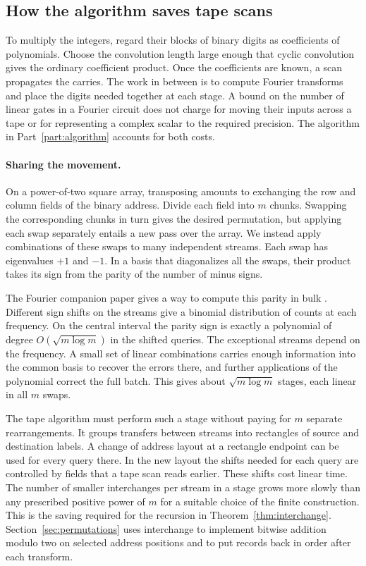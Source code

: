 \subsection{How the algorithm saves tape scans}

To multiply the integers, regard their blocks of binary digits as
coefficients of polynomials. Choose the convolution length large
enough that cyclic convolution gives the ordinary coefficient
product. Once the coefficients are known, a scan propagates the
carries. The work in between is to compute Fourier transforms and
place the digits needed together at each stage. A bound on the number
of linear gates in a Fourier circuit does not charge for moving
their inputs across a tape or for representing a complex scalar to
the required precision. The algorithm in Part~\ref{part:algorithm}
accounts for both costs.

\paragraph{Sharing the movement.}
On a power-of-two square array, transposing amounts to exchanging the
row and column fields of the binary address. Divide each field into
$m$ chunks. Swapping the corresponding chunks in turn gives the
desired permutation, but applying each swap separately entails a new
pass over the array. We instead apply combinations of these swaps to
many independent streams. Each swap has eigenvalues $+1$ and $-1$.
In a basis that diagonalizes all the swaps, their product takes its
sign from the parity of the number of minus signs.

The Fourier companion paper gives a way to compute this parity in
bulk \cite[Section~]{oaF}. Different sign shifts on
the streams give a binomial distribution of counts at each frequency.
On the central interval the parity sign is exactly a polynomial of
degree $O(\sqrt{m\log m})$ in the shifted queries. The exceptional
streams depend on the frequency. A small set of linear combinations
carries enough information into the common basis to recover the
errors there, and further applications of the polynomial correct
the full batch. This gives about $\sqrt{m\log m}$ stages, each linear
in all $m$ swaps.

The tape algorithm must perform such a stage without paying for $m$
separate rearrangements. It groups transfers between streams into
rectangles of source and destination labels. A change of address
layout at a rectangle endpoint can be used for every query there.
In the new layout the shifts needed for each query are controlled by
fields that a tape scan reads earlier. These shifts cost linear time.
The number of smaller interchanges per stream in a stage grows more
slowly than any prescribed positive power of $m$ for a suitable
choice of the finite construction. This is the saving required for
the recursion in Theorem~\ref{thm:interchange}. Section~\ref{sec:permutations}
uses interchange to implement bitwise addition modulo two on selected
address positions and to put records back in order after each transform.

